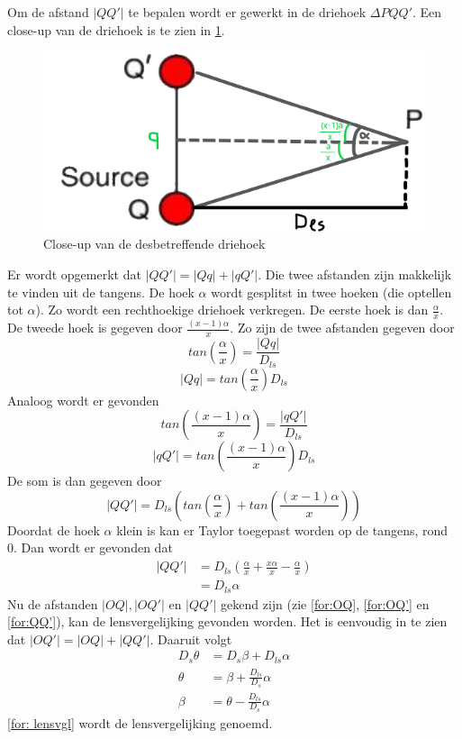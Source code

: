 Om de afstand $|QQ'|$ te bepalen wordt er gewerkt in de driehoek $\Delta PQQ'$. Een close-up van de driehoek is te zien in \cref{fig:driehoek}.
\begin{figure}[h]
    \centering
    \includegraphics[scale=0.45]{Figures/driehoek.png}
    \caption{Close-up van de desbetreffende driehoek}
    \label{fig:driehoek}
\end{figure}
Er wordt opgemerkt dat $|QQ'| = |Qq|+|qQ'|$. Die twee afstanden zijn makkelijk te vinden uit de tangens. De hoek $\alpha$ wordt gesplitst in twee hoeken (die optellen tot $\alpha$). Zo wordt een rechthoekige driehoek verkregen. De eerste hoek is dan $\frac{\alpha}{x}$. De tweede hoek is gegeven door $\frac{(x-1)\alpha}{x}$. Zo zijn de twee afstanden gegeven door
$$tan(\frac{\alpha}{x})=\frac{|Qq|}{D_{ls}}$$
$$|Qq|=tan(\frac{\alpha}{x})D_{ls}$$
Analoog wordt er gevonden
$$tan(\frac{(x-1)\alpha}{x})=\frac{|qQ'|}{D_{ls}}$$
$$|qQ'|=tan(\frac{(x-1)\alpha}{x})D_{ls}$$
De som is dan gegeven door
$$|QQ'|=D_{ls}(tan(\frac{\alpha}{x})+tan(\frac{(x-1)\alpha}{x}))$$
Doordat de hoek $\alpha$ klein is kan er Taylor toegepast worden op de tangens, rond 0. Dan wordt er gevonden dat
\begin{align}
    |QQ'| &=D_{ls}(\frac{\alpha}{x}+\frac{x\alpha}{x}-\frac{\alpha}{x}) \nonumber\\
    &=D_{ls}\alpha
    \label{for:QQ'}
\end{align}
Nu de afstanden $|OQ|, |OQ'|$ en $|QQ'|$ gekend zijn (zie \cref{for:OQ}, \cref{for:OQ'} en \cref{for:QQ'}), kan de lensvergelijking gevonden worden. Het is eenvoudig in te zien dat $|OQ'|=|OQ|+|QQ'|$. Daaruit volgt
\begin{align}
    D_{s}\theta &=D_{s}\beta + D_{ls}\alpha \nonumber\\
    \theta &= \beta + \frac{D_{ls}}{D_{s}}\alpha \nonumber\\
    \beta &= \theta - \frac{D_{ls}}{D_{s}}\alpha
    \label{for: lensvgl}
\end{align}
\cref{for: lensvgl} wordt de lensvergelijking genoemd.

